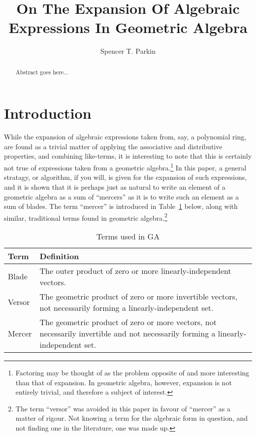 \documentclass{birkjour}
\theoremstyle{definition}
\theoremstyle{remark}
\numberwithin{equation}{section}
\begin{document}
\title{On The Expansion Of Algebraic Expressions In Geometric Algebra}

\author{Spencer T. Parkin}



\begin{abstract}
Abstract goes here...
\end{abstract}


\maketitle

\section{Introduction}

While the expansion of algebraic expressions taken from, say, a polynomial ring, are found as a trivial matter
of applying the associative and distributive properties, and combining like-terms, it is interesting to note
that this is certainly not true of expressions taken from a geometric algebra.\footnote{Factoring may be thought of as the problem opposite of and more
interesting than that of expansion.  In geometric algebra, however, expansion is not entirely trivial, and therefore a subject of interest.}
In this paper, a general stratagy, or algorithm, if you will, is given for the expansion of such expressions, and it is shown that
it is perhaps just as natural to write an element of a geometric algebra as a sum of ``mercers'' as it is to
write such an element as a sum of blades.  The term ``mercer'' is introduced in Table~\ref{tbl_terms} below,
along with similar, traditional terms found in geometric algebra.\footnote{The term ``versor'' was avoided in
this paper in favour of ``mercer'' as a matter of rigour.  Not knowing a term for the algebraic form in question, and not finding
one in the literature, one was made up.}

\begin{table}[H]\label{tbl_terms}\caption{Terms used in GA}
\begin{tabular}{p{1cm}p{9cm}}
Term & Definition \\
\hline
Blade & The outer product of zero or more linearly-independent vectors. \\
Versor & The geometric product of zero or more invertible vectors, not necessarily forming a linearly-independent set. \\
Mercer & The geometric product of zero or more vectors, not necessarily invertible and not necessarily forming a linearly-independent set.
\end{tabular}
\end{table}
\end{document}
